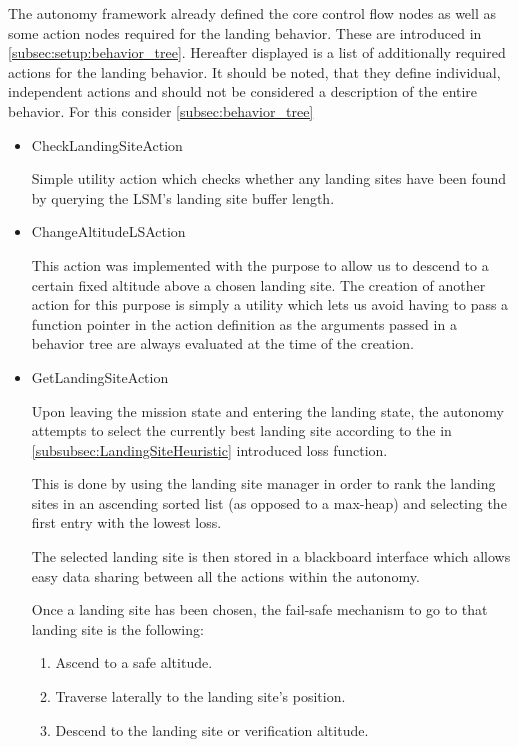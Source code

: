 The autonomy framework already defined the core control flow nodes as well as some action nodes required for the landing behavior. These are introduced in \cref{subsec:setup:behavior_tree}. Hereafter displayed is a list of additionally required actions for the landing behavior. It should be noted, that they define individual, independent actions and should not be considered a description of the entire behavior. For this consider \cref{subsec:behavior_tree}

\begin{itemize}
    \item CheckLandingSiteAction

    Simple utility action which checks whether any landing sites have been found by querying the LSM's landing site buffer length.
    \item ChangeAltitudeLSAction

    This action was implemented with the purpose to allow us to descend to a certain fixed altitude above a chosen landing site. The creation of another action for this purpose is simply a utility which lets us avoid having to pass a function pointer in the action definition as the arguments passed in a behavior tree are always evaluated at the time of the creation.
    \item GetLandingSiteAction

    Upon leaving the mission state and entering the landing state, the autonomy attempts to select the currently best landing site according to the in \cref{subsubsec:LandingSiteHeuristic} introduced loss function.

    This is done by using the landing site manager in order to rank the landing sites in an ascending sorted list (as opposed to a max-heap) and selecting the first entry with the lowest loss.

    The selected landing site is then stored in a blackboard interface which allows easy data sharing between all the actions within the autonomy.

    Once a landing site has been chosen, the fail-safe mechanism to go to that landing site is the following:

    \begin{enumerate}
        \item Ascend to a safe altitude.
        \item Traverse laterally to the landing site's position.
        \item Descend to the landing site or verification altitude.
    \end{enumerate}


\end{itemize}
